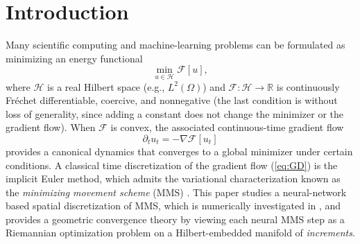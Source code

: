 \documentclass[twoside,11pt]{article}
\newcommand{\calF}{\mathcal{F}}
\newcommand{\calH}{\mathcal{H}}
\begin{document}
\section{Introduction}
Many scientific computing and machine-learning problems can be formulated as minimizing an energy functional
\begin{equation}\label{eq:intro:main_problem}
\min_{u\in \calH} \calF[u],
\end{equation}
where $\calH$ is a real Hilbert space (e.g., $L^2(\Omega)$) and $\calF:\calH\to\mathbb{R}$ is continuously Fr\'echet differentiable, coercive, and nonnegative (the last condition is without loss of generality, since adding a constant does not change the minimizer or the gradient flow). When $\calF$ is convex, the associated continuous-time gradient flow
\begin{equation}\label{eq:GD}
\partial_t u_t=-\nabla \calF[u_t]
\end{equation}
provides a canonical dynamics that converges to a global minimizer under certain conditions.
A classical time discretization of the gradient flow (\ref{eq:GD}) is the implicit Euler method,
which admits the variational characterization known as the \emph{minimizing movement scheme} (MMS) \citep{ambrosio2005gradient}.
This paper studies a neural-network based spatial discretization of MMS, which is numerically investigated in \citet{HuEnergetic2024}, and provides a geometric convergence theory by viewing each neural MMS step as a Riemannian optimization problem on a Hilbert-embedded manifold of \emph{increments}.
\end{document}
